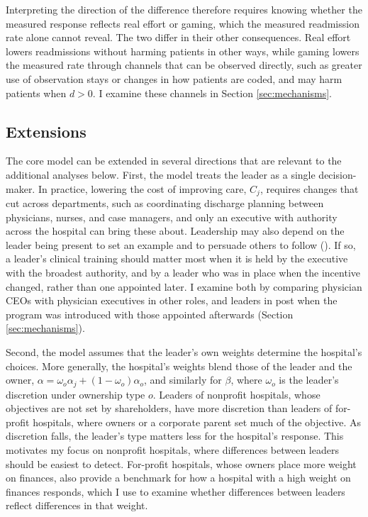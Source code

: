 \documentclass[12pt]{article}
\theoremstyle{definition}   %
\begin{document}
    Interpreting the direction of the difference therefore requires knowing whether the measured response reflects real effort or gaming, which the measured readmission rate alone cannot reveal. The two differ in their other consequences. Real effort lowers readmissions without harming patients in other ways, while gaming lowers the measured rate through channels that can be observed directly, such as greater use of observation stays or changes in how patients are coded, and may harm patients when $d > 0$. I examine these channels in Section \ref{sec:mechanisms}.
 

    \subsection{Extensions}

    The core model can be extended in several directions that are relevant to the additional analyses below. First, the model treats the leader as a single decision-maker. In practice, lowering the cost of improving care, $C_j$, requires changes that cut across departments, such as coordinating discharge planning between physicians, nurses, and case managers, and only an executive with authority across the hospital can bring these about. Leadership may also depend on the leader being present to set an example and to persuade others to follow (\cite{hermalin1998toward}). If so, a leader's clinical training should matter most when it is held by the executive with the broadest authority, and by a leader who was in place when the incentive changed, rather than one appointed later. I examine both by comparing physician CEOs with physician executives in other roles, and leaders in post when the program was introduced with those appointed afterwards (Section \ref{sec:mechanisms}).
 
    Second, the model assumes that the leader's own weights determine the hospital's choices. More generally, the hospital's weights blend those of the leader and the owner, $\alpha = \omega_o \alpha_j + (1 - \omega_o) \alpha_o$, and similarly for $\beta$, where $\omega_o$ is the leader's discretion under ownership type $o$. Leaders of nonprofit hospitals, whose objectives are not set by shareholders, have more discretion than leaders of for-profit hospitals, where owners or a corporate parent set much of the objective. As discretion falls, the leader's type matters less for the hospital's response. This motivates my focus on nonprofit hospitals, where differences between leaders should be easiest to detect. For-profit hospitals, whose owners place more weight on finances, also provide a benchmark for how a hospital with a high weight on finances responds, which I use to examine whether differences between leaders reflect differences in that weight.
 
\end{document}
